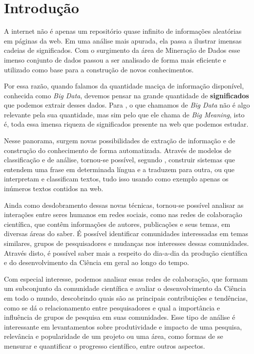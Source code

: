 \chapter{Introdução}
\label{cap:introducao}

A internet não é apenas um repositório quase infinito de informações aleatórias em páginas da web. Em uma análise mais apurada, ela passa a ilustrar imensas cadeias de significados. Com o surgimento da área de Mineração de Dados esse imenso conjunto de dados passou a ser analisado de forma mais eficiente e utilizado como base para a construção de novos conhecimentos.

Por essa razão, quando falamos da quantidade maciça de informação disponível, conhecida como \textit{Big Data}, devemos pensar na grande quantidade de \textbf{significados} que podemos extrair desses dados. Para \cite{Kay2014}, o que chamamos de \textit{Big Data} não é algo relevante pela sua quantidade, mas sim pelo que ele chama de \textit{Big Meaning}, isto é, toda essa imensa riqueza de significados presente na web que podemos estudar.

Nesse panorama, surgem novas possibilidades de extração de informação e de construção do conhecimento de forma automatizada. Através de modelos de classificação e de análise, tornou-se possível, segundo \cite{Halevy2009}, construir sistemas que entendem uma frase em determinada língua e a traduzem para outra, ou que interpretam e classificam textos, tudo isso usando como exemplo apenas os inúmeros textos contidos na web.

Ainda como desdobramento dessas novas técnicas, tornou-se possível analisar as interações entre seres humanos em redes sociais, como nas redes de colaboração científica, que contêm informações de autores, publicações e seus temas, em diversas áreas do saber. É possível identificar comunidades interessadas em temas similares, grupos de pesquisadores e mudanças nos interesses dessas comunidades. Através disto, é possível saber mais a respeito do dia-a-dia da produção científica e do desenvolvimento da Ciência em geral ao longo do tempo.

Com especial interesse, podemos analisar essas redes de colaboração, que formam um subconjunto da comunidade científica e avaliar o desenvolvimento da Ciência em todo o mundo, descobrindo quais são as principais contribuições e tendências, como se dá o relacionamento entre pesquisadores e qual a importância e influência de grupos de pesquisa em suas comunidades. Esse tipo de análise é interessante em levantamentos sobre produtividade e impacto de uma pesquisa, relevância e popularidade de um projeto ou uma área, como formas de se mensurar e quantificar o progresso científico, entre outros aspectos.

